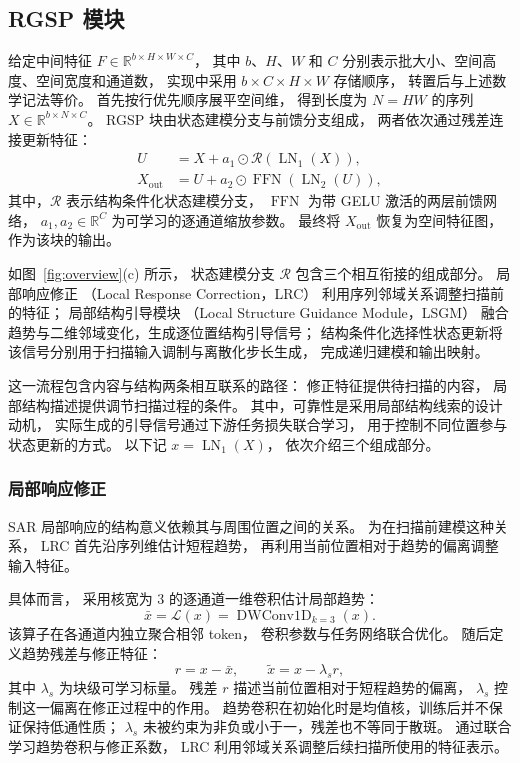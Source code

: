 \documentclass[journal]{IEEEtran}
\begin{document}
\subsection{RGSP 模块}
\label{sec:rgsp}

给定中间特征
$F\in\mathbb{R}^{b\times H\times W\times C}$，
其中 $b$、$H$、$W$ 和 $C$
分别表示批大小、空间高度、空间宽度和通道数，
实现中采用 $b\times C\times H\times W$ 存储顺序，
转置后与上述数学记法等价。
首先按行优先顺序展平空间维，
得到长度为 $N=HW$ 的序列
$X\in\mathbb{R}^{b\times N\times C}$。
RGSP 块由状态建模分支与前馈分支组成，
两者依次通过残差连接更新特征：
\begin{equation}
\begin{aligned}
U
&=
X+a_1\odot
\mathcal{R}\left(\operatorname{LN}_1(X)\right),
\\
X_{\mathrm{out}}
&=
U+a_2\odot
\operatorname{FFN}\left(\operatorname{LN}_2(U)\right),
\end{aligned}
\label{eq:rgsp_block}
\end{equation}
其中，$\mathcal{R}$ 表示结构条件化状态建模分支，
$\operatorname{FFN}$ 为带 GELU 激活的两层前馈网络，
$a_1,a_2\in\mathbb{R}^{C}$
为可学习的逐通道缩放参数。
最终将 $X_{\mathrm{out}}$ 恢复为空间特征图，
作为该块的输出。

如图~\ref{fig:overview}(c) 所示，
状态建模分支 $\mathcal{R}$ 包含三个相互衔接的组成部分。
局部响应修正
（Local Response Correction，LRC）
利用序列邻域关系调整扫描前的特征；
局部结构引导模块
（Local Structure Guidance Module，LSGM）
融合趋势与二维邻域变化，生成逐位置结构引导信号；
结构条件化选择性状态更新将该信号分别用于扫描输入调制与离散化步长生成，
完成递归建模和输出映射。

这一流程包含内容与结构两条相互联系的路径：
修正特征提供待扫描的内容，
局部结构描述提供调节扫描过程的条件。
其中，可靠性是采用局部结构线索的设计动机，
实际生成的引导信号通过下游任务损失联合学习，
用于控制不同位置参与状态更新的方式。
以下记
$x=\operatorname{LN}_1(X)$，
依次介绍三个组成部分。


\subsubsection{局部响应修正}
\label{sec:lrc}

SAR 局部响应的结构意义依赖其与周围位置之间的关系。
为在扫描前建模这种关系，
LRC 首先沿序列维估计短程趋势，
再利用当前位置相对于趋势的偏离调整输入特征。

具体而言，
采用核宽为 $3$ 的逐通道一维卷积估计局部趋势：
\begin{equation}
\bar{x}
=
\mathcal{L}(x)
=
\operatorname{DWConv1D}_{k=3}(x).
\label{eq:local_trend}
\end{equation}
该算子在各通道内独立聚合相邻 token，
卷积参数与任务网络联合优化。
随后定义趋势残差与修正特征：
\begin{equation}
r=x-\bar{x},
\qquad
\tilde{x}=x-\lambda_s r,
\label{eq:residual}
\end{equation}
其中 $\lambda_s$ 为块级可学习标量。
残差 $r$ 描述当前位置相对于短程趋势的偏离，
$\lambda_s$ 控制这一偏离在修正过程中的作用。
趋势卷积在初始化时是均值核，训练后并不保证保持低通性质；
$\lambda_s$ 未被约束为非负或小于一，残差也不等同于散斑。
通过联合学习趋势卷积与修正系数，
LRC 利用邻域关系调整后续扫描所使用的特征表示。
\end{document}
